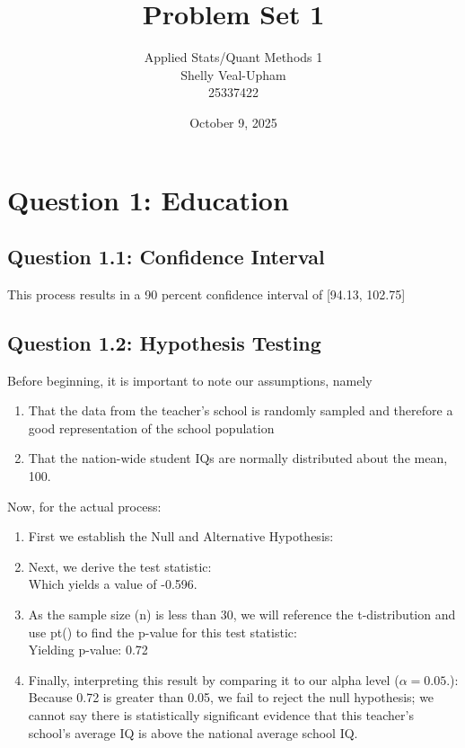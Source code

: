 \documentclass[12pt,letterpaper]{article}
\title{Problem Set 1}
\date{October 9, 2025}
\author{Applied Stats/Quant Methods 1\\
Shelly Veal-Upham\\
25337422}
\begin{document}
	\maketitle
	
	\vspace{.5cm}
	\section*{Question 1: Education}
	\subsection*{Question 1.1: Confidence Interval}

  
This process results in a 90 percent confidence interval of [94.13, 102.75]\\
\vspace{.5cm}
	\subsection*{Question 1.2: Hypothesis Testing}
	Before beginning, it is important to note our assumptions, namely
\begin{enumerate}
	\item That the data from the teacher's school is randomly sampled and therefore a good representation of the school population
	\item That the nation-wide student IQs are normally distributed about the mean, 100.
\end{enumerate}
\vspace{.5cm}
Now, for the actual process:
\begin{enumerate}
	\item First we establish the Null and Alternative Hypothesis:\\
	  
	\item Next, we derive the test statistic:\\ 
	  
	Which yields a value of -0.596.\\
	\item As the sample size (n) is less than 30, we will reference the t-distribution and use pt() to find the p-value for this test statistic:\\
	  
	Yielding p-value: 0.72
	\item Finally, interpreting this result by comparing it to our alpha level ($\alpha=0.05$.):\\
	Because 0.72 is greater than 0.05, we fail to reject the null hypothesis; we cannot say there is statistically significant evidence that this teacher's school's average IQ is above the national average school IQ.
\end{enumerate}
\end{document}
